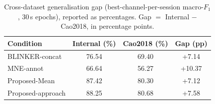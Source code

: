 \begin{table}[ht]
  \centering
  \caption{Cross-dataset generalisation gap (best-channel-per-session macro-$F_1$, 30\,s epochs), reported as percentages. Gap $=$ Internal $-$ Cao2018, in percentage points.}
  \label{tab:cross_dataset_gap}
  \begin{tabular}{lccc}
    \toprule
    Condition & Internal (\%) & Cao2018 (\%) & Gap (pp) \\
    \midrule
    BLINKER-concat & 76.54 & 69.40 & +7.14 \\
    MNE-annot & 66.64 & 56.27 & +10.37 \\
    Proposed-Mean & 87.42 & 80.30 & +7.12 \\
    Proposed-approach & 88.25 & 80.68 & +7.58 \\
    \bottomrule
  \end{tabular}
\end{table}
